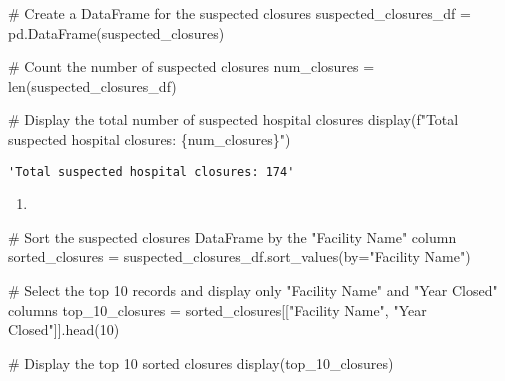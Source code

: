 \documentclass[
  letterpaper,
  DIV=11,
  numbers=noendperiod]{scrartcl}
\newenvironment{Shaded}{\begin{snugshade}}{\end{snugshade}}
\newcommand{\BuiltInTok}[1]{\textcolor[rgb]{0.00,0.23,0.31}{#1}}
\newcommand{\CommentTok}[1]{\textcolor[rgb]{0.37,0.37,0.37}{#1}}
\newcommand{\DecValTok}[1]{\textcolor[rgb]{0.68,0.00,0.00}{#1}}
\newcommand{\NormalTok}[1]{\textcolor[rgb]{0.00,0.23,0.31}{#1}}
\newcommand{\OperatorTok}[1]{\textcolor[rgb]{0.37,0.37,0.37}{#1}}
\newcommand{\SpecialCharTok}[1]{\textcolor[rgb]{0.37,0.37,0.37}{#1}}
\newcommand{\SpecialStringTok}[1]{\textcolor[rgb]{0.13,0.47,0.30}{#1}}
\newcommand{\StringTok}[1]{\textcolor[rgb]{0.13,0.47,0.30}{#1}}
\providecommand{\tightlist}{%
  \setlength{\itemsep}{0pt}\setlength{\parskip}{0pt}}\usepackage{longtable,booktabs,array}
\begin{document}
\begin{Shaded}
\begin{Highlighting}[]
\CommentTok{\# Create a DataFrame for the suspected closures}
\NormalTok{suspected\_closures\_df }\OperatorTok{=}\NormalTok{ pd.DataFrame(suspected\_closures)}

\CommentTok{\# Count the number of suspected closures}
\NormalTok{num\_closures }\OperatorTok{=} \BuiltInTok{len}\NormalTok{(suspected\_closures\_df)}

\CommentTok{\# Display the total number of suspected hospital closures}
\NormalTok{display(}\SpecialStringTok{f"Total suspected hospital closures: }\SpecialCharTok{\{}\NormalTok{num\_closures}\SpecialCharTok{\}}\SpecialStringTok{"}\NormalTok{)}
\end{Highlighting}
\end{Shaded}

\begin{verbatim}
'Total suspected hospital closures: 174'
\end{verbatim}

\begin{enumerate}
\def\labelenumi{\arabic{enumi}.}
\setcounter{enumi}{1}
\tightlist
\item
\end{enumerate}

\begin{Shaded}
\begin{Highlighting}[]
\CommentTok{\# Sort the suspected closures DataFrame by the "Facility Name" column}
\NormalTok{sorted\_closures }\OperatorTok{=}\NormalTok{ suspected\_closures\_df.sort\_values(by}\OperatorTok{=}\StringTok{"Facility Name"}\NormalTok{)}

\CommentTok{\# Select the top 10 records and display only "Facility Name" and "Year Closed" columns}
\NormalTok{top\_10\_closures }\OperatorTok{=}\NormalTok{ sorted\_closures[[}\StringTok{"Facility Name"}\NormalTok{, }\StringTok{"Year Closed"}\NormalTok{]].head(}\DecValTok{10}\NormalTok{)}

\CommentTok{\# Display the top 10 sorted closures}
\NormalTok{display(top\_10\_closures)}
\end{Highlighting}
\end{Shaded}
\end{document}
